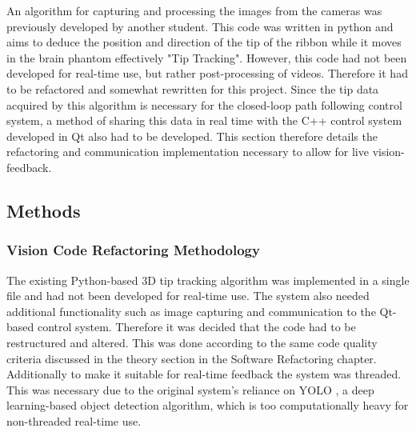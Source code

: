 An algorithm for capturing and processing the images from the cameras was previously developed by another student. This code was written in python and aims to deduce the position and direction of the tip of the ribbon while it moves in the brain phantom effectively "Tip Tracking". However, this code had not been developed for real-time use, but rather post-processing of videos.  Therefore it had to be refactored and somewhat rewritten for this project. Since the tip data acquired by this algorithm is necessary for the closed-loop path following control system, a method of sharing this data in real time with the C++ control system developed in Qt also had to be developed. This section therefore details the refactoring and communication implementation necessary to allow for live vision-feedback.



\subsection{Methods}

\subsubsection{Vision Code Refactoring Methodology}
The existing Python-based 3D tip tracking algorithm was implemented in a single file and had not been developed for real-time use. The system also needed additional functionality such as image capturing and communication to the Qt-based control system. Therefore it was decided that the code had to be restructured and altered. This was done according to the same code quality criteria discussed in the theory section in the Software Refactoring chapter. Additionally to make it suitable for real-time feedback the system was threaded. This was necessary due to the original system's reliance on YOLO \cite{redmon_you_2016}, a deep learning-based object detection algorithm, which is too computationally heavy for non-threaded real-time use.

